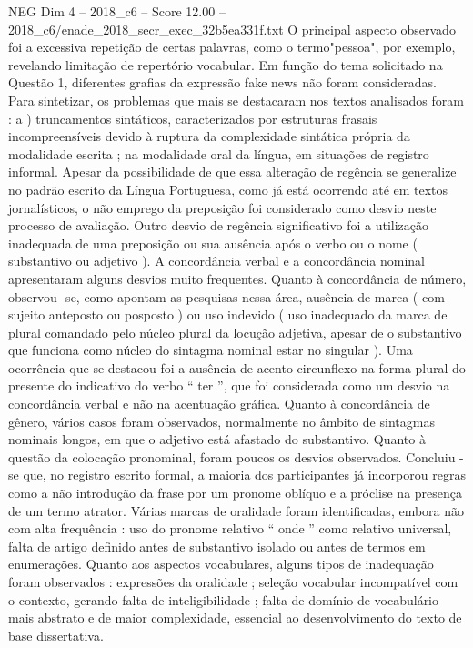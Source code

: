 \begin{textsample}{NEG Dim 4 – 2018\_c6 – Score 12.00 – 2018\_c6/enade\_2018\_secr\_exec\_32b5ea331f.txt}
O principal aspecto observado foi a excessiva repetição de certas palavras, como o termo"pessoa", por exemplo, revelando limitação de repertório vocabular.
Em função do tema solicitado na Questão 1, diferentes grafias da expressão fake news não foram consideradas.
Para sintetizar, os problemas que mais se destacaram nos textos analisados foram : a ) truncamentos sintáticos, caracterizados por estruturas frasais incompreensíveis devido à ruptura da complexidade sintática própria da modalidade escrita ; na modalidade oral da língua, em situações de registro informal.
Apesar da possibilidade de que essa alteração de regência se generalize no padrão escrito da Língua Portuguesa, como já está ocorrendo até em textos jornalísticos, o não emprego da preposição foi considerado como desvio neste processo de avaliação.
Outro desvio de regência significativo foi a utilização inadequada de uma preposição ou sua ausência após o verbo ou o nome ( substantivo ou adjetivo ).
A concordância verbal e a concordância nominal apresentaram alguns desvios muito frequentes.
Quanto à concordância de número, observou -se, como apontam as pesquisas nessa área, ausência de marca ( com sujeito anteposto ou posposto ) ou uso indevido ( uso inadequado da marca de plural comandado pelo núcleo plural da locução adjetiva, apesar de o substantivo que funciona como núcleo do sintagma nominal estar no singular ).
Uma ocorrência que se destacou foi a ausência de acento circunflexo na forma plural do presente do indicativo do verbo “ ter ”, que foi considerada como um desvio na concordância verbal e não na acentuação gráfica.
Quanto à concordância de gênero, vários casos foram observados, normalmente no âmbito de sintagmas nominais longos, em que o adjetivo está afastado do substantivo.
Quanto à questão da colocação pronominal, foram poucos os desvios observados.
Concluiu -se que, no registro escrito formal, a maioria dos participantes já incorporou regras como a não introdução da frase por um pronome oblíquo e a próclise na presença de um termo atrator.
Várias marcas de oralidade foram identificadas, embora não com alta frequência : uso do pronome relativo “ onde ” como relativo universal, falta de artigo definido antes de substantivo isolado ou antes de termos em enumerações.
Quanto aos aspectos vocabulares, alguns tipos de inadequação foram observados : expressões da oralidade ; seleção vocabular incompatível com o contexto, gerando falta de inteligibilidade ; falta de domínio de vocabulário mais abstrato e de maior complexidade, essencial ao desenvolvimento do texto de base dissertativa.

\end{textsample}
